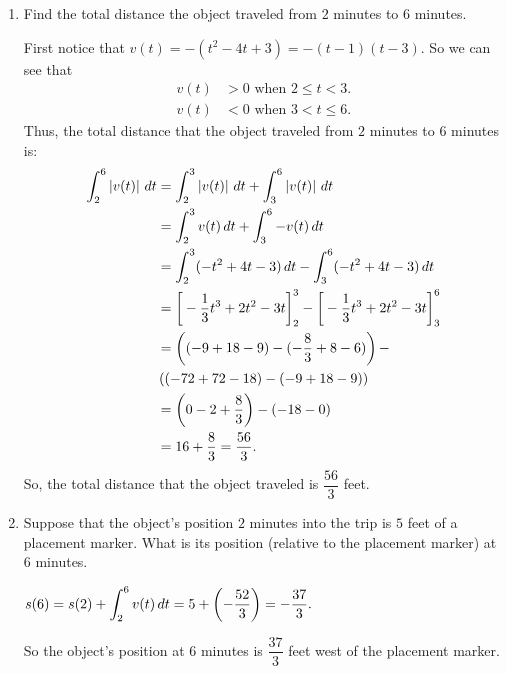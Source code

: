 \documentclass{ximera}
\begin{document}
\begin{problem}
\begin{enumerate}
\begin{enumerate}
		\item  Find the total distance the object traveled from $2$ minutes to $6$ minutes.
		\begin{explanation}
				First notice that $v(t) = -(t^2 - 4t + 3) = -(t-1)(t-3)$.  So we can see that
					\begin{align*}
						v(t) &> 0 \text{ when }  2 \leq t < 3.  \\
						v(t) &< 0 \text{ when } 3 < t \leq 6.
					\end{align*}
					Thus, the total distance that the object traveled from $2$ minutes to $6$ minutes is:
					\begin{align*}
						\displaystyle \int_2^6 \left| v(t) \right| \,d t &= \displaystyle \int_2^3 \left| v(t) \right| \,d t + \displaystyle \int_3^6 \left| v(t) \right| \,d t  \\
							&= \displaystyle \int_2^3 v(t) \,d t + \displaystyle \int_3^6 - v(t) \,d t  \\
							&= \displaystyle \int_2^3 (-t^2 + 4t - 3) \,d t - \displaystyle \int_3^6 (-t^2 + 4t - 3) \,d t  \\
							&= \bigg[ - \dfrac{1}{3} t^3 + 2t^2 - 3t \bigg]_2^3 - \bigg[ - \dfrac{1}{3} t^3 + 2t^2 - 3t \bigg]_3^6  \\
							&= \left( (-9+18-9) - (- \dfrac{8}{3} + 8 - 6) \right) -  \\
							& \left( (-72+72-18)-(-9+18-9) \right)  \\
							&= \left(0 - 2 + \dfrac{8}{3} \right) - \left( -18 - 0 \right)  \\
							&=  16 + \dfrac{8}{3} = \dfrac{56}{3}.
					\end{align*}
				So, the total distance that the object traveled is $\dfrac{56}{3}$ feet.
			\end{explanation}

		\item  Suppose that the object's position $2$ minutes into the trip is $5$ feet of a placement marker.  What is its position (relative to the placement marker) at $6$ minutes.
		\begin{explanation}
				$s(6) = s(2) + \displaystyle \int_2^6 v(t) \,d t = 5 + \left(- \dfrac{52}{3} \right) = - \dfrac{37}{3}. $

				So the object's position at $6$ minutes is $\dfrac{37}{3}$ feet west of the placement marker.
			\end{explanation}
		\end{enumerate}
		

\end{enumerate}
\end{problem}
\end{document}
